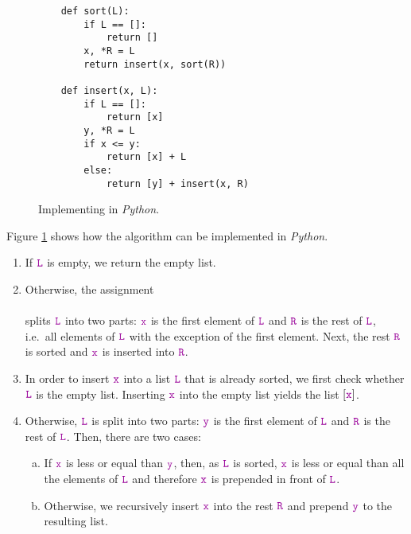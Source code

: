 \begin{figure}[!ht]
  \centering
\begin{verbatim}
    def sort(L):
        if L == []:
            return []
        x, *R = L
        return insert(x, sort(R))
        
    def insert(x, L):
        if L == []:
            return [x]
        y, *R = L
        if x <= y:
            return [x] + L
        else:
            return [y] + insert(x, R)
\end{verbatim}
\vspace*{-0.3cm}
  \caption{Implementing  in \textsl{Python}.}
  \label{fig:Insertion-Sort.ipynb}
\end{figure} 

\noindent
Figure \ref{fig:Insertion-Sort.ipynb} shows how the  algorithm can be implemented 
in \textsl{Python}.
\begin{enumerate}
\item If $\mytt{L}$ is empty, we return the empty list.
\item Otherwise, the assignment
      \\[0.2cm]
      \hspace*{1.3cm}
      \\[0.2cm]
      splits $\mytt{L}$ into two parts: $\mytt{x}$ is the first element of $\mytt{L}$ and $\mytt{R}$ is the rest of $\mytt{L}$,
      i.e.~all elements of $\mytt{L}$ with the exception of the first element.  Next, the rest $\mytt{R}$
      is sorted and $\mytt{x}$ is inserted into $\mytt{R}$.
\item In order to insert $\mytt{x}$ into a list $\mytt{L}$ that is already sorted, we first check whether
      $\mytt{L}$ is the empty list.  Inserting $\mytt{x}$ into the empty list yields the list $[\mytt{x}]$.
\item Otherwise, $\mytt{L}$ is split into two parts: $\mytt{y}$ is the first element of $\mytt{L}$ and
      $\mytt{R}$ is the rest of $\mytt{L}$. 
      Then, there are two cases:
      \begin{enumerate}[(a)]
      \item If $\mytt{x}$ is less or equal than $\mytt{y}$, then, as $\mytt{L}$ is sorted,  $\mytt{x}$
            is less or equal than all the elements of $\mytt{L}$ and therefore $\mytt{x}$ is prepended in front
            of $\mytt{L}$. 
      \item Otherwise, we recursively insert $\mytt{x}$ into the rest $\mytt{R}$ and prepend $\mytt{y}$
            to the resulting list.     
      \end{enumerate}
\end{enumerate}

